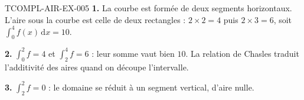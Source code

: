 \begin{corrige}{TCOMPL-AIR-EX-005}
\textbf{1.} La courbe est formée de deux segments horizontaux. L'aire sous la
courbe est celle de deux rectangles : $2\times2=4$ puis $2\times3=6$, soit
$\displaystyle\int_0^4 f(x)\,\mathrm{d}x=10$.

\textbf{2.} $\int_0^2 f=4$ et $\int_2^4 f=6$ : leur somme vaut bien $10$. La
relation de Chasles traduit l'additivité des aires quand on découpe
l'intervalle.

\textbf{3.} $\int_2^2 f=0$ : le domaine se réduit à un segment vertical,
d'aire nulle.
\end{corrige}
